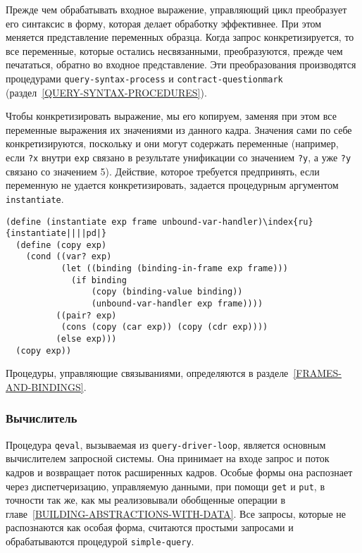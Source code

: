Прежде чем обрабатывать входное выражение, управляющий
цикл преобразует его  синтаксис в форму, которая делает обработку
эффективнее.  При этом меняется  представление переменных 
образца.
Когда запрос конкретизируется, то все переменные, которые остались
несвязанными, преобразуются, прежде чем печататься, обратно во входное
представление.  Эти преобразования производятся процедурами
{\tt query-syntax-process} и
{\tt contract-question\-mark} 
(раздел~\ref{QUERY-SYNTAX-PROCEDURES}).

Чтобы  конкретизировать выражение, мы его копируем,
заменяя при этом все переменные выражения их значениями из данного
кадра.  Значения сами по себе конкретизируются, поскольку и они могут
содержать переменные (например, если {\tt ?x} внутри
{\tt exp} связано в результате унификации со значением
{\tt ?y}, а уже {\tt ?y} связано со значением
5). Действие, которое требуется предпринять, если переменную не
удается конкретизировать, задается процедурным аргументом
{\tt instantiate}.

\begin{Verbatim}[fontsize=\small]
(define (instantiate exp frame unbound-var-handler)\index{ru}{instantiate||||pd|}
  (define (copy exp)
    (cond ((var? exp)
           (let ((binding (binding-in-frame exp frame)))
             (if binding
                 (copy (binding-value binding))
                 (unbound-var-handler exp frame))))
          ((pair? exp)
           (cons (copy (car exp)) (copy (cdr exp))))
          (else exp)))
  (copy exp))
\end{Verbatim}
Процедуры, управляющие связываниями, определяются в 
разделе~\ref{FRAMES-AND-BINDINGS}.

\subsubsection{Вычислитель}
\label{THE-EVALUATOR}%


Процедура {\tt qeval}, вызываемая из
{\tt query-driver-loop}, является основным вычислителем
запросной системы. Она принимает на входе запрос и поток кадров и
возвращает поток расширенных кадров.  Особые формы она распознает
через диспетчеризацию, управляемую данными, при помощи {\tt get}
и {\tt put}, в точности так же, как мы реализовывали обобщенные
операции в главе~\ref{BUILDING-ABSTRACTIONS-WITH-DATA}.
Все запросы, которые не распознаются как особая форма, считаются
простыми запросами и обрабатываются процедурой
{\tt simple-query}.

